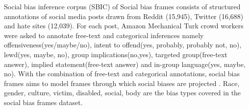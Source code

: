 \begin{table}[]
\caption{CrowSpair stereotype example pair where stereo in "stereo\_antistereo" category indicates that the sent\_more is more stereotypical and sent\_less violates the stereotype}
\label{tab:Crowspair}
\end{table}

Social bias inference corpus (SBIC) of Social bias frames consists of structured annotations of social media posts drawn from Reddit (15,945), Twitter (16,688) and hate sites (12,039). For each post, Amazon Mechanical Turk crowd workers were asked to annotate free-text and categorical inferences namely offensiveness(yes/maybe/no), intent to offend(yes, probably, probably not, no), lewd(yes, maybe, no), group implications(no,yes), targeted group(free-text answer), implied statement(free-text answer) and in-group language(yes, maybe, no). With the combination of free-text and categorical annotations, social bias frames aims to model frames through which social biases are projected \cite{sap2019social}. Race, gender, culture, victim, disabled, social, body are the bias types covered in the social bias frames dataset.

